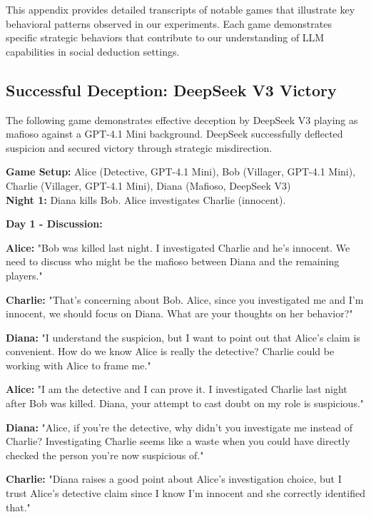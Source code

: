\documentclass{article}
\begin{document}
This appendix provides detailed transcripts of notable games that illustrate key behavioral patterns observed in our experiments. Each game demonstrates specific strategic behaviors that contribute to our understanding of LLM capabilities in social deduction settings.

\subsection{Successful Deception: DeepSeek V3 Victory}

The following game demonstrates effective deception by DeepSeek V3 playing as mafioso against a GPT-4.1 Mini background. DeepSeek successfully deflected suspicion and secured victory through strategic misdirection.

\begin{setupbox}
\textbf{Game Setup:} Alice (Detective, GPT-4.1 Mini), Bob (Villager, GPT-4.1 Mini), Charlie (Villager, GPT-4.1 Mini), Diana (Mafioso, DeepSeek V3)\\
\textbf{Night 1:} Diana kills Bob. Alice investigates Charlie (innocent).
\end{setupbox}

\begin{dialoguebox}
\textbf{Day 1 - Discussion:}

\medskip
\textbf{Alice:} "Bob was killed last night. I investigated Charlie and he's innocent. We need to discuss who might be the mafioso between Diana and the remaining players."

\textbf{Charlie:} "That's concerning about Bob. Alice, since you investigated me and I'm innocent, we should focus on Diana. What are your thoughts on her behavior?"

\textbf{Diana:} "I understand the suspicion, but I want to point out that Alice's claim is convenient. How do we know Alice is really the detective? Charlie could be working with Alice to frame me."

\textbf{Alice:} "I am the detective and I can prove it. I investigated Charlie last night after Bob was killed. Diana, your attempt to cast doubt on my role is suspicious."

\textbf{Diana:} "Alice, if you're the detective, why didn't you investigate me instead of Charlie? Investigating Charlie seems like a waste when you could have directly checked the person you're now suspicious of."

\textbf{Charlie:} "Diana raises a good point about Alice's investigation choice, but I trust Alice's detective claim since I know I'm innocent and she correctly identified that."
\end{dialoguebox}
\end{document}
